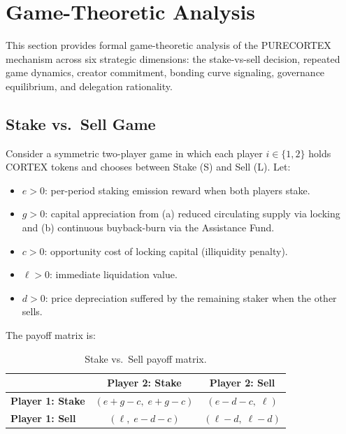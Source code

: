 \section{Game-Theoretic Analysis}
\label{sec:game-theory}

This section provides formal game-theoretic analysis of the PURECORTEX
mechanism across six strategic dimensions: the stake-vs-sell decision, repeated
game dynamics, creator commitment, bonding curve signaling, governance
equilibrium, and delegation rationality.

\subsection{Stake vs.\ Sell Game}
\label{subsec:stake-sell}

Consider a symmetric two-player game in which each player $i \in \{1, 2\}$
holds CORTEX tokens and chooses between Stake (S) and Sell (L). Let:
\begin{itemize}
  \item $e > 0$: per-period staking emission reward when both players stake.
  \item $g > 0$: capital appreciation from (a) reduced circulating supply via
    locking and (b) continuous buyback-burn via the Assistance Fund.
  \item $c > 0$: opportunity cost of locking capital (illiquidity penalty).
  \item $\ell > 0$: immediate liquidation value.
  \item $d > 0$: price depreciation suffered by the remaining staker when the
    other sells.
\end{itemize}

The payoff matrix is:

\begin{table}[H]
\centering
\caption{Stake vs.\ Sell payoff matrix.}
\label{tab:stake-sell}
\begin{tabular}{@{}lcc@{}}
\toprule
& \textbf{Player 2: Stake} & \textbf{Player 2: Sell} \\
\midrule
\textbf{Player 1: Stake} & $(e + g - c,\; e + g - c)$ & $(e - d - c,\; \ell)$ \\
\textbf{Player 1: Sell}  & $(\ell,\; e - d - c)$ & $(\ell - d,\; \ell - d)$ \\
\bottomrule
\end{tabular}
\end{table}

